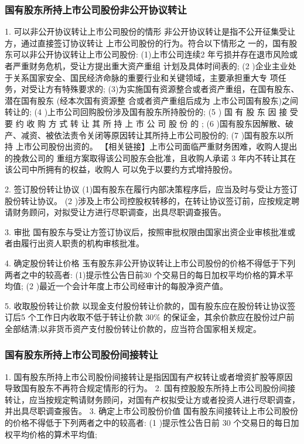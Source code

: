 \documentclass[UTF8,12pt]{ctexart}
\numberwithin{equation}{section} %
\numberwithin{figure}{section}
\numberwithin{table}{section}
\begin{document}
	\subsubsection{国有股东所持上市公司股份非公开协议转让}
	1. 可以非公开协议转让上市公司股份的情形
	非公开协议转让是指不公开征集受让方，通过直接签订协议转让 上市公司股份的行为。符合以下情形之 一的，国有股东可以非公开协议转让上市公司股份:
	(1)上市公司连续2 年亏损并存在退市风险或者严重财务危机，受让方提出重大资产重组
	计划及具体时间表的;
	(2 )企业主业处于关系国家安全、国民经济命脉的重要行业和关键领域，主要承担重大专
	项任务，对受让方有特殊要求的;
	(3)为实施国有资源整合或者资产重组，在国有股东、潜在国有股东 (经本次国有资源整
	合或者资产重组后成为 上市公司国有股东)之间转让的;
	(4 )上市公司回购股份涉及国有股东所持股份的;
	(5 ) 国 有 股 东 因 接 受 要 约 收 购 方 式 转 让 其 所 持 上 市 公 司 股 份 的 ;
	(6 )国有股东因解散、破产、减资、被依法责令关闭等原因转让其所持上市公司股份的;
	(7 )国有股东以所持 上市公司股份出资的。
	【相关链接】上市公司面临严重财务困难，收购人提出的挽救公司的 重组方案取得该公司股东会批准，且收购人承诺 3 年内不转让其在该公司中所拥有的权益，收购人 可以免于以要约方式增持股份。
	
	2. 签订股份转让协议
	(1)国有股东在履行内部决策程序后，应当及时与受让方签订股份转让协议。
	(2 )涉及上市公司控股权转移的，在转让协议签订前，应按规定聘请财务顾问，对拟受让方进行尽职调查，出具尽职调查报告。
	
	3. 审批
	国有股东与受让方签订协议后，按照审批权限由国家出资企业审核批准或者由履行出资人职责的机构审核批准。
	
	4. 确定股份转让价格
	玉有股东非公开协议转让上市公司股份的价格不得低于下列两者之中的较高者:
	(1)提示性公告日前30 个交易日的每日加权平均价格的算术平均值;
	(2 )最近一个会计年度上市公司经审计的每股净资产值。
	
	5. 收取股份转让价款
	以现金支付股份转让价款的，国有股东应在股份转让协议签订后5 个工作日内收取不低于转让价款 30\% 的保证金，其余价款应在股份过户前全部结清;以非货币资产支付股份转让价款的，应当符合国家相关规定。
	
	\subsubsection{国有股东所持上市公司股份间接转让}
	1. 国有股东所持上市公司股份间接转让是指因国有产权转让或者增资扩股等原因导致国有股东不再符合规定情形的行为。
	2. 国有控股股东所持上市公司股份间接转让，应当按规定鸭请财务顾问，对国有产权拟受让方或者投资人进行尽职调查，并出具尽职调查报告。
	3. 确定上市公司股份价值
	国有股东间接转让上市公司股份的价格不得低于下列两者之中的较高者:
	(1 )提示性公告日前 30 个交易日的每日加权平均价格的算术平均值;
	
\end{document}
